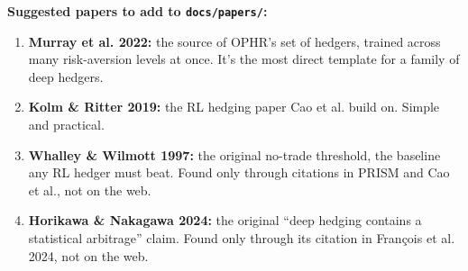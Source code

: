 \documentclass{article}
\begin{document}
\textbf{Suggested papers to add to \texttt{docs/\allowbreak{}papers/\allowbreak{}}:}

\begin{enumerate}

\item \textbf{Murray et al. 2022:} the source of OPHR's set of hedgers, trained across many risk-aversion levels at once. It's the most direct template for a family of deep hedgers.

\item \textbf{Kolm \& Ritter 2019:} the RL hedging paper Cao et al. build on. Simple and practical.

\item \textbf{Whalley \& Wilmott 1997:} the original no-trade threshold, the baseline any RL hedger must beat. Found only through citations in PRISM and Cao et al., not on the web.

\item \textbf{Horikawa \& Nakagawa 2024:} the original ``deep hedging contains a statistical arbitrage'' claim. Found only through its citation in François et al. 2024, not on the web.

\end{enumerate}
\end{document}
